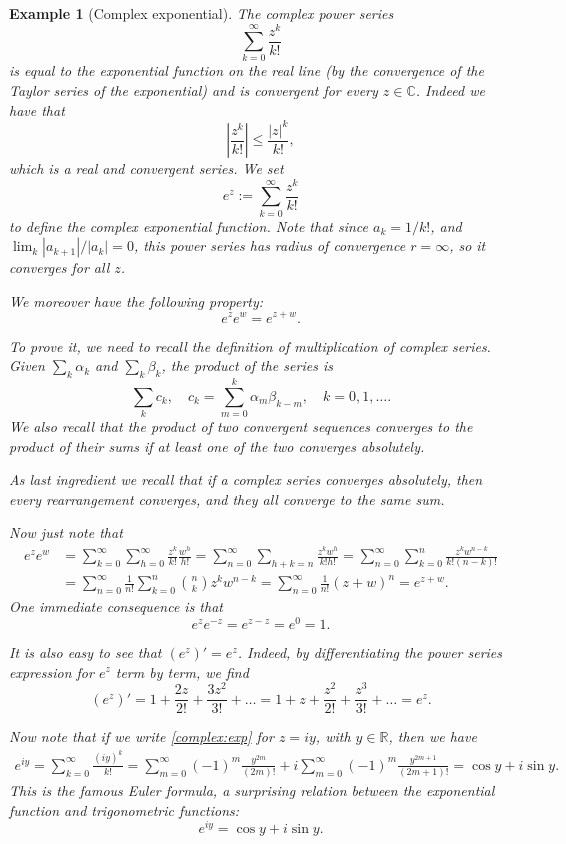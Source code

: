 \documentclass[a4paper,reqno]{amsart}
\numberwithin{equation}{section}
\newtheorem{example}[definition]{Example}
\def\C{\mathbb{C}}
\def\R{\mathbb{R}}
\begin{document}
\begin{example}[Complex exponential]
The complex power series 
$$
\sum_{k=0}^\infty \frac{z^k}{k!}
$$
is equal to the exponential function on the real line (by the convergence of the Taylor series of the exponential) and is convergent for every $z\in \C$. Indeed we have that 
$$
\left|\frac{z^k}{k!}\right| \leq \frac{|z|^k}{k!},
$$
which is a real and convergent series. We set
\begin{equation}\label{complex:exp}
e^z:= \sum_{k=0}^\infty \frac{z^k}{k!}
\end{equation}
to define the \textit{complex exponential function}. Note that since $a_k = 1/k!$, and $\lim_k|a_{k+1}|/|a_k|=0$, this power series has radius of convergence $r=\infty$, so it converges for all $z$.

We moreover have the following property:
\begin{equation}
e^z e^w = e^{z+w}.
\end{equation}

To prove it, we need to recall the definition of multiplication of complex series. Given $\sum_k \alpha_k$ and $\sum_k \beta_k$, the product of the series is 
$$
\sum_k c_k, \quad c_k = \sum_{m=0}^k \alpha_m \beta_{k-m}, \quad k=0,1,\dots.
$$
We also recall that the product of two convergent sequences converges to the product of their sums if at least one of the two converges absolutely.

As last ingredient we recall that if a complex series converges absolutely, then every rearrangement converges, and they all converge to the same sum.
\medskip
 
Now just note that 
\begin{align*}
e^z e^w &= \sum_{k=0}^\infty \sum_{h=0}^\infty \frac{z^k}{k!} \frac{w^h}{h!} = \sum_{n=0}^\infty \sum_{h+k=n} \frac{z^k w^h}{k!h!}  = \sum_{n=0}^\infty \sum_{k=0}^n  \frac{z^k w^{n-k}}{k!(n-k)!}\\
& = \sum_{n=0}^\infty \frac{1}{n!} \sum_{k=0}^n \binom{n}{k}z^k w^{n-k} = \sum_{n=0}^\infty \frac{1}{n!} (z+w)^n = e^{z+w}.
\end{align*}
One immediate consequence is that 
$$
e^z e^{-z} = e^{z-z} = e^0 = 1.
$$

\medskip

It is also easy to see that $(e^z)'=e^z$. Indeed, by differentiating the power series expression for $e^z$ term by term, we find 
$$
(e^z)' = 1+ \frac{2z}{2!} + \frac{3z^2}{3!}+\dots = 1+ z+\frac{z^2}{2!} + \frac{z^3}{3!}+\dots = e^z.
$$

\medskip


Now note that if we write \eqref{complex:exp} for $z=iy$, with $y\in \R$, then we have 
\begin{align*}
e^{iy} = \sum_{k=0}^\infty \frac{(iy)^k}{k!} = \sum_{m=0}^\infty (-1)^m\frac{y^{2m}}{(2m)!} + i \sum_{m=0}^\infty (-1)^m\frac{y^{2m+1}}{(2m+1)!}  = \cos y+ i\sin y.
\end{align*}
This is the famous Euler formula, a surprising relation between the exponential function and trigonometric functions:
$$
e^{iy} = \cos y + i \sin y.
$$
\end{example}
\end{document}
